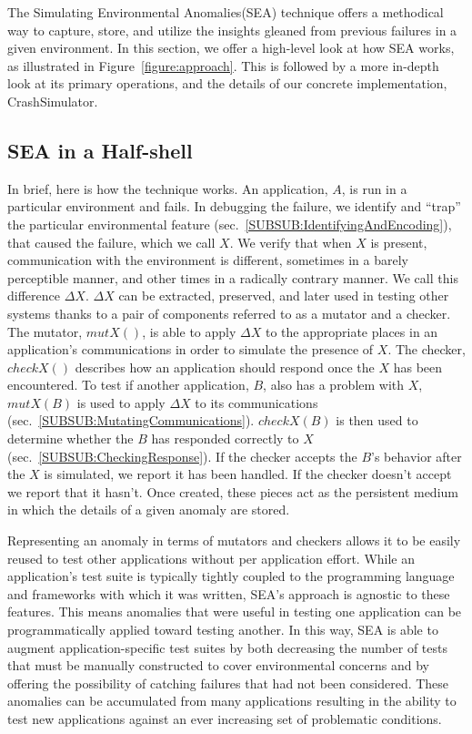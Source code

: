 The Simulating Environmental Anomalies(SEA) technique
offers a methodical way to
capture, store, and utilize the insights gleaned from
previous failures in a given environment.
In this section, we offer a high-level look at how
SEA works, as illustrated in Figure~\ref{figure:approach}.
This is followed by a more in-depth look at its primary operations,
and the details of our concrete implementation, CrashSimulator.

\subsection{SEA in a Half-shell}
\label{SEC:SEAHalfshell}
In brief,
here is how the technique works.
An application, $A$, is run
in a particular environment and fails.
In debugging the failure,
we identify and ``trap'' the particular environmental feature
(sec.~\ref{SUBSUB:IdentifyingAndEncoding}),
that caused the failure,  which we call $X$.
We verify that when $X$ is present,
communication with the
environment is different,
sometimes in a barely perceptible manner,
and other times in a radically contrary manner.
We call this difference $\Delta X$.
$\Delta X$ can be extracted, preserved,
and later used in testing other systems
thanks to a pair of components referred to as a mutator and a checker.
The mutator, $mutX()$,
is able to apply $\Delta X$
to the appropriate places in an application's communications
in order to simulate the presence of $X$.
The checker, $checkX()$ describes how an
application should respond once the $X$ has been encountered.
To test if another application, $B$, also has a problem with $X$,
$mutX(B)$ is used to apply $\Delta X$ to its communications
(sec.~\ref{SUBSUB:MutatingCommunications}).
$checkX(B)$ is then used to determine whether the
$B$ has responded correctly to $X$(sec.~\ref{SUBSUB:CheckingResponse}).
If the checker accepts the $B$'s behavior
after the $X$ is simulated,
we report it has been handled.
If the checker doesn't accept we report that it hasn't.
Once created,
these pieces act as the persistent medium in which the details of
a given anomaly are stored.

Representing an anomaly in terms of mutators and checkers
allows it to be easily reused to test other applications
without per application effort.
While an application's test suite is typically
tightly coupled to the programming language
and frameworks with which it was written,
SEA's approach is agnostic to these features.
This means anomalies that were useful in testing one application
can be programmatically applied toward testing another.
In this way, SEA is able to augment application-specific test suites
by both decreasing the number of tests
that must be manually constructed
to cover environmental concerns
and by offering the possibility of catching
failures that had not been considered.
These anomalies can be accumulated from many applications
resulting in the ability to test new applications
against an ever increasing
set of problematic conditions.

